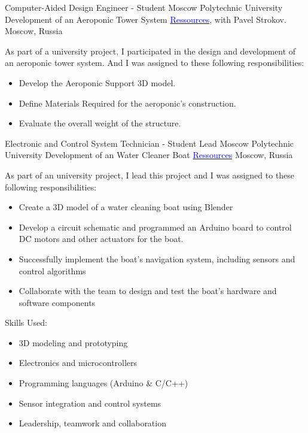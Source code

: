 \vspace{2mm}

    {Computer-Aided Design Engineer - Student}
    {Moscow Polytechnic University}
    {
    \newline
    Development of an Aeroponic Tower System
    \href{https://drive.google.com/drive/folders/1GYReOb4vYT3_jlym9ULB7Yud_lAxtPxk}{\textcolor{blue}{Ressources}}, with Pavel Strokov.
    }
    {Moscow, Russia}
    {
    As part of a university project, I participated in the design and development of an aeroponic tower system. And I was assigned to these following responsibilities:
    \begin{itemize}
        \item Develop the Aeroponic Support 3D model.
        \item Define Materials Required for the aeroponic's construction.
        \item Evaluate the overall weight of the structure.
    \end{itemize}
    }

\vspace{1mm}

    {Electronic and Control System Technician - Student Lead}
    {Moscow Polytechnic University}
    {
    \newline
    Development of an Water Cleaner Boat
    \href{https://github.com/DanGlChris/Water-cleaning-boat}{\textcolor{blue}{Ressources}}}
    {Moscow, Russia}
    {
    As part of an university project, I lead this project and I was assigned to these following responsibilities:
    \vspace{1mm}
    \begin{itemize}
        \item Create a 3D model of a water cleaning boat using Blender
        \item Develop a circuit schematic and programmed an Arduino board to control DC motors and other actuators for the boat.
        \item Successfully implement the boat's navigation system, including sensors and control algorithms
        \item Collaborate with the team to design and test the boat's hardware and software components
    \end{itemize}
    \vspace{1mm}
    Skills Used:
    \begin{itemize}
        \item 3D modeling and prototyping
        \item Electronics and microcontrollers
        \item Programming languages (Arduino \& C/C++)
        \item Sensor integration and control systems
        \item Leadership, teamwork and collaboration
    \end{itemize}
    }

